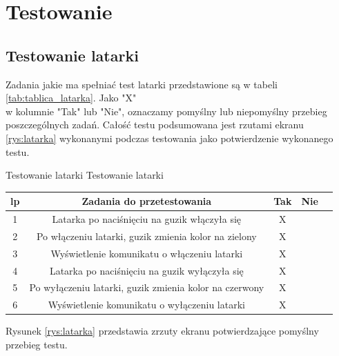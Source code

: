 	\newpage
\section{Testowanie}	%


\subsection{Testowanie latarki}

\hspace{0.60cm}Zadania jakie ma spełniać test latarki przedstawione są w tabeli \ref{tab:tablica_latarka}. Jako "X" \\ w kolumnie "Tak" lub "Nie", oznaczamy pomyślny lub niepomyślny przebieg poszczególnych zadań. Całość testu podsumowana jest rzutami ekranu \ref{rys:latarka} wykonanymi podczas testowania jako potwierdzenie wykonanego testu.

\begin{tabela}
	{Testowanie latarki}	%
	{Testowanie latarki}	%
	{
		\begin{tabular}{|c|c|c|c|c|} \hline
			\textbf{lp} & \textbf{Zadania do przetestowania} & \textbf{Tak} & \textbf{Nie} \\ \hline
			1 & Latarka po naciśnięciu na guzik włączyła się & X & ~ \\ \hline
			2 & Po włączeniu latarki, guzik zmienia kolor na zielony & X & ~ \\ \hline
			3 & Wyświetlenie komunikatu o włączeniu latarki & X & ~ \\ \hline
			4 & Latarka po naciśnięciu na guzik wyłączyła się & X & ~ \\ \hline
			5 & Po wyłączeniu latarki, guzik zmienia kolor na czerwony & X & ~ \\ \hline
			6 & Wyświetlenie komunikatu o wyłączeniu latarki & X & ~ \\ \hline
		\end{tabular}	}
	\label{tab:tablica_latarka}
\end{tabela}

Rysunek \ref{rys:latarka} przedstawia zrzuty ekranu potwierdzające pomyślny przebieg testu.

